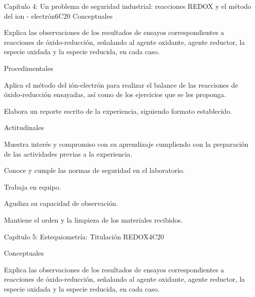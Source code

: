 \begin{syllabus}
\begin{unit}{Capítulo 4: Un problema de seguridad industrial: reacciones REDOX y el método del ion - electrón}{}{}{6}{C20}
Conceptuales

\begin{topics}
      \item  Explica las observaciones de los resultados de ensayos correspondientes a reacciones de óxido-reducción, señalando al agente oxidante, agente reductor, la especie oxidada y la especie reducida, en cada caso.
   \end{topics}
   
   Procedimentales

\begin{topics}
      \item Aplica el método del ión-electrón para realizar el balance de las reacciones de óxido-reducción ensayadas, así como de los ejercicios que se les proponga.
      \item Elabora un reporte escrito de la experiencia, siguiendo formato establecido.
   \end{topics}
   
   Actitudinales

\begin{topics}
      \item Muestra interés y compromiso con su aprendizaje cumpliendo con la preparación de las actividades previas a la experiencia.
      \item Conoce y cumple las normas de seguridad en el laboratorio.
      \item Trabaja en equipo.
      \item Agudiza su capacidad de observación.
     \item Mantiene el orden y la limpieza de los materiales recibidos.
   \end{topics}

   \begin{learningoutcomes}
      \item 
   \end{learningoutcomes}
   
\end{unit}

\begin{unit}{Capítulo 5:  Estequiometría: Titulación REDOX}{}{}{4}{C20}

Conceptuales

\begin{topics}
      \item  Explica las observaciones de los resultados de ensayos correspondientes a reacciones de óxido-reducción, señalando al agente oxidante, agente reductor, la especie oxidada y la especie reducida, en cada caso.
   \end{topics}
   

\end{unit}
\end{syllabus}
